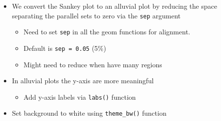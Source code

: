 \documentclass[
]{book}
\providecommand{\tightlist}{%
  \setlength{\itemsep}{0pt}\setlength{\parskip}{0pt}}
\begin{document}
\begin{itemize}
\tightlist
\item
  We convert the Sankey plot to an alluvial plot by reducing the space separating the parallel sets to zero via the \texttt{sep} argument

  \begin{itemize}
  \tightlist
  \item
    Need to set \texttt{sep} in all the geom functions for alignment.
  \item
    Default is \texttt{sep\ =\ 0.05} (5\%)
  \item
    Might need to reduce when have many regions
  \end{itemize}
\item
  In alluvial plots the y-axis are more meaningful

  \begin{itemize}
  \tightlist
  \item
    Add y-axis labels via \texttt{labs()} function
  \end{itemize}
\item
  Set background to white using \texttt{theme\_bw()} function
\end{itemize}
\end{document}
